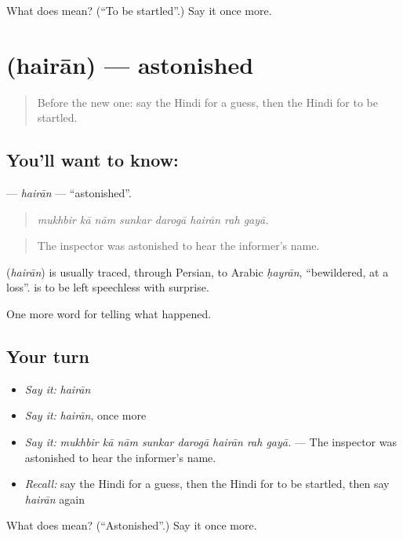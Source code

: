 \begin{tcolorbox}[breakable,colback=teal!4,colframe=teal!35!black,title={Before you move on}]
What does  mean? (\textquotedblleft{}To be startled\textquotedblright{}.) Say it once more.
\end{tcolorbox}
\section[\texorpdfstring{\hi{हैरान} (hairān)}{हैरान (hairān)}]{ (hairān) — astonished}

\label{lesson:HI-C317-hairan}



\begin{quote}
Before the new one: say the Hindi for a guess, then the Hindi for to be startled.
\end{quote}

\subsection*{You'll want to know: }
\textbf{} — \emph{hairān} — \textquotedblleft{}astonished\textquotedblright{}.

\begin{quote}
       
\end{quote}

\begin{quote}
\emph{mukhbir kā nām sunkar darogā hairān rah gayā.}
\end{quote}

\begin{quote}
The inspector was astonished to hear the informer's name.
\end{quote}

\begin{cousinweb}
\textbf{} (\emph{hairān}) is usually traced, through Persian, to Arabic \emph{ḥayrān}, \textquotedblleft{}bewildered, at a loss\textquotedblright{}. \textbf{  } is to be left speechless with surprise.
\end{cousinweb}

\begin{grammarlens}[title={What you've built}]
One more word for telling what happened.
\end{grammarlens}

\subsection*{Your turn}
\begin{itemize}
\raggedright
  \item \emph{Say it:} \emph{hairān}
  \item \emph{Say it:} \emph{hairān}, once more
  \item \emph{Say it:} \emph{mukhbir kā nām sunkar darogā hairān rah gayā.} — The inspector was astonished to hear the informer's name.
  \item \emph{Recall:} say the Hindi for a guess, then the Hindi for to be startled, then say \emph{hairān} again
\end{itemize}

\begin{tcolorbox}[breakable,colback=teal!4,colframe=teal!35!black,title={Before you move on}]
What does  mean? (\textquotedblleft{}Astonished\textquotedblright{}.) Say it once more.
\end{tcolorbox}
